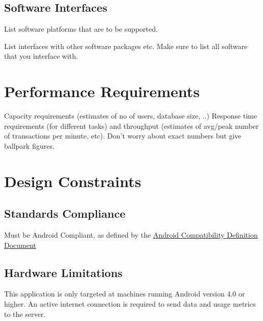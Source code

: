 \documentclass[a4wide]{article}
\begin{document}
\subsection{Software Interfaces}

List software platforms that are to be supported.

List interfaces with other software packages etc.
Make sure to list all software that you interface with.



\section{Performance Requirements}

Capacity requirements (estimates of no of users, database size, ..)
Response time requirements (for different tasks)
and throughput (estimates of avg/peak number of transactions per minute, etc).
Don't worry about exact numbers but give ballpark figures.



\section{Design Constraints}

\subsection{Standards Compliance}

Must be Android Compliant, as defined by the \href{http://static.googleusercontent.com/media/source.android.com/en/us/compatibility/4.0/android-4.0-cdd.pdf}{Android Compatibility Definition Document}

\subsection{Hardware Limitations}

This application is only targeted at machines running Android version 4.0 or
higher. An active internet connection is required to send data and usage metrics
to the server.


\end{document}
